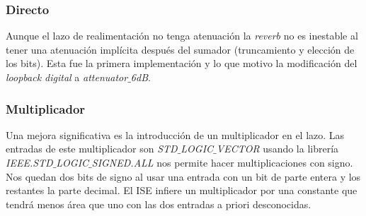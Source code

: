 		\subsubsection{Directo} 
		Aunque el lazo de realimentación no tenga atenuación la \emph{reverb} no es inestable al tener una atenuación implícita después del sumador (truncamiento y elección de los bits). Esta fue la primera implementación y lo que motivo la modificación del \emph{loopback digital} a \emph{attenuator$\_$6dB}.
		
		\subsubsection{Multiplicador}
		Una mejora significativa es la introducción de un multiplicador en el lazo. Las entradas de este multiplicador son \emph{STD$\_$LOGIC$\_$VECTOR} usando la librería \emph{IEEE.STD$\_$LOGIC$\_$SIGNED.ALL} nos permite hacer multiplicaciones con signo. Nos quedan dos bits de signo al usar una entrada con un bit de parte entera y los restantes la parte decimal. El ISE infiere un multiplicador por una constante que tendrá menos área que uno con las dos entradas a priori desconocidas.

	



